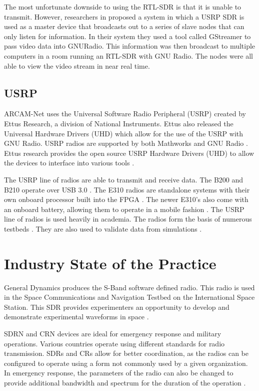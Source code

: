 	The most unfortunate downside to using the RTL-SDR is that it is unable to transmit. However, researchers in \cite{6922233} proposed a system in which a USRP SDR is used as a master device that broadcasts out to a series of slave nodes that can only listen for information. In their system they used a tool called GStreamer to pass video data into GNURadio. This information was then broadcast to multiple computers in a room running an RTL-SDR with GNU Radio. The nodes were all able to view the video stream in near real time.  

\subsection{USRP}

ARCAM-Net uses the Universal Software Radio Peripheral (USRP) created by Ettus Research, a division of National Instruments\cite{0006}. Ettus also released the Universal Hardware Drivers (UHD) \cite{0007} which allow for the use of the USRP with GNU Radio. USRP radios are supported by both Mathworks \cite{0027} and GNU Radio \cite{0026}. Ettus research provides the open source USRP Hardware Drivers (UHD) to allow the devices to interface into various tools \cite{0007}.

The USRP line of radios are able to transmit and receive data. The B200 and B210 operate over USB 3.0 \cite{0034}. The E310 radios are standalone systems with their own onboard processor built into the FPGA \cite{0035}. The newer E310's also come with an onboard battery, allowing them to operate in a mobile fashion \cite{0036}. The USRP line of radios is used heavily in academia. The radios form the basis of numerous testbeds  \cite{4753441} \cite{4212821}. They are also used to validate data from simulations \cite{5508221}. 

\section{Industry State of the Practice}

General Dynamics produces the S-Band software defined radio. This radio is used in the Space Communications and Navigation Testbed on the International Space Station. This SDR provides experimenters an opportunity to develop and demonstrate experimental waveforms in space \cite{6497193}. 

SDRN and CRN devices are ideal for emergency response and military operations. Various countries operate using different standards for radio transmission. SDRs and CRs allow for better coordination, as the radios can be configured to operate using a form not commonly used by a given organization. In emergency response, the parameters of the radio can also be changed to provide additional bandwidth and spectrum for the duration of the operation \cite{5639025}. 

